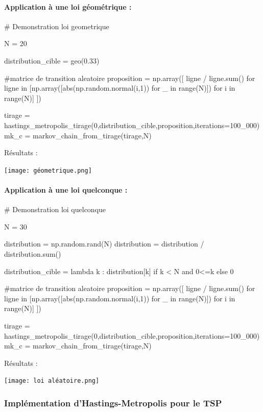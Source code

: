 \documentclass{article}
\begin{document}
\newpage
\paragraph{Application à une loi géométrique :}
\begin{center}
\begin{python}
# Demonstration loi geometrique

N = 20

distribution_cible = geo(0.33)

#matrice de transition aleatoire
proposition = np.array([ ligne / ligne.sum()
    for ligne in [np.array([abs(np.random.normal(i,1)) for _ in range(N)]) for i in range(N)]
])

tirage = hastings_metropolis_tirage(0,distribution_cible,proposition,iterations=100_000)
mk_c = markov_chain_from_tirage(tirage,N)
\end{python}
\end{center}
Résultats :

\texttt{[image: géometrique.png]}

\newpage
\paragraph{Application à une loi quelconque :}
\begin{center}
\begin{python}
# Demonstration loi quelconque

N = 30

distribution = np.random.rand(N)
distribution = distribution / distribution.sum()

distribution_cible = lambda k : distribution[k] if k < N and 0<=k else 0

#matrice de transition aleatoire
proposition = np.array([ ligne / ligne.sum()
    for ligne in [np.array([abs(np.random.normal(i,1)) for _ in range(N)]) for i in range(N)]
])

tirage = hastings_metropolis_tirage(0,distribution_cible,proposition,iterations=100_000)
mk_c = markov_chain_from_tirage(tirage,N)
\end{python}
\end{center}
Résultats :

\texttt{[image: loi aléatoire.png]}

\subsubsection{Implémentation d'Hastings-Metropolis pour le TSP}
\end{document}
